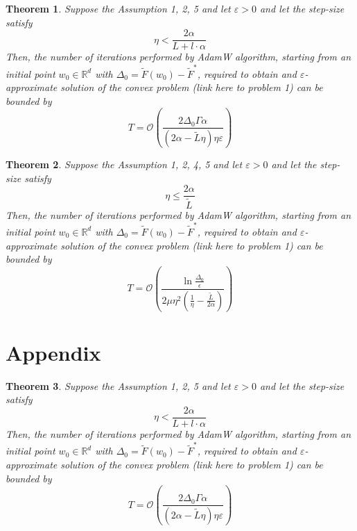 \documentclass{article}
\newtheorem{theorem}{Theorem}
\begin{document}
\begin{theorem}

Suppose the Assumption 1, 2, 5 and let $\varepsilon > 0$ and let the step-size satisfy
\begin{equation*}
    \eta < \frac{2 \alpha}{L + l \cdot \alpha} 
\end{equation*}
Then, the number of iterations performed by AdamW algorithm, starting from an initial point $w_0 \in \mathbb{R}^d$ with $\Delta_0 = \tilde{F}(w_0) - \tilde{F}^*$, required to obtain and $\varepsilon$-approximate solution of the convex problem (link here to problem 1) can be bounded by
\begin{equation*}
      T = \mathcal{O}\left( \frac{2\Delta_0 \Gamma \alpha } {(2\alpha - \tilde{L}\eta) \eta \varepsilon} \right)
\end{equation*}

\end{theorem}

\begin{theorem}
    Suppose the Assumption 1, 2, 4, 5 and let $\varepsilon > 0$ and let the step-size satisfy
    \begin{equation*}
        \eta \leq \frac{2 \alpha}{\tilde{L}}
    \end{equation*}
    Then, the number of iterations performed by AdamW algorithm, starting from an initial point $w_0 \in \mathbb{R}^d$ with $\Delta_0 = \tilde{F}(w_0) - \tilde{F}^*$, required to obtain and $\varepsilon$-approximate solution of the convex problem (link here to problem 1) can be bounded by
    \begin{equation*}
        T =  \mathcal{O}\left( \frac{\ln \frac{\Delta_0}{\epsilon}}{2 \mu \eta^2(\frac{1}{\eta} - \frac{\tilde{L}}{2 \alpha})} \right)
    \end{equation*}
\end{theorem}



\section{Appendix}

\begin{theorem}
Suppose the Assumption 1, 2, 5 and let $\varepsilon > 0$ and let the step-size satisfy
\begin{equation*}
    \eta < \frac{2 \alpha}{L + l \cdot \alpha} 
\end{equation*}
Then, the number of iterations performed by AdamW algorithm, starting from an initial point $w_0 \in \mathbb{R}^d$ with $\Delta_0 = \tilde{F}(w_0) - \tilde{F}^*$, required to obtain and $\varepsilon$-approximate solution of the convex problem (link here to problem 1) can be bounded by
\begin{equation*}
      T = \mathcal{O}\left( \frac{2\Delta_0 \Gamma \alpha } {(2\alpha - \tilde{L}\eta) \eta \varepsilon} \right)
\end{equation*}

\end{theorem}
\end{document}
